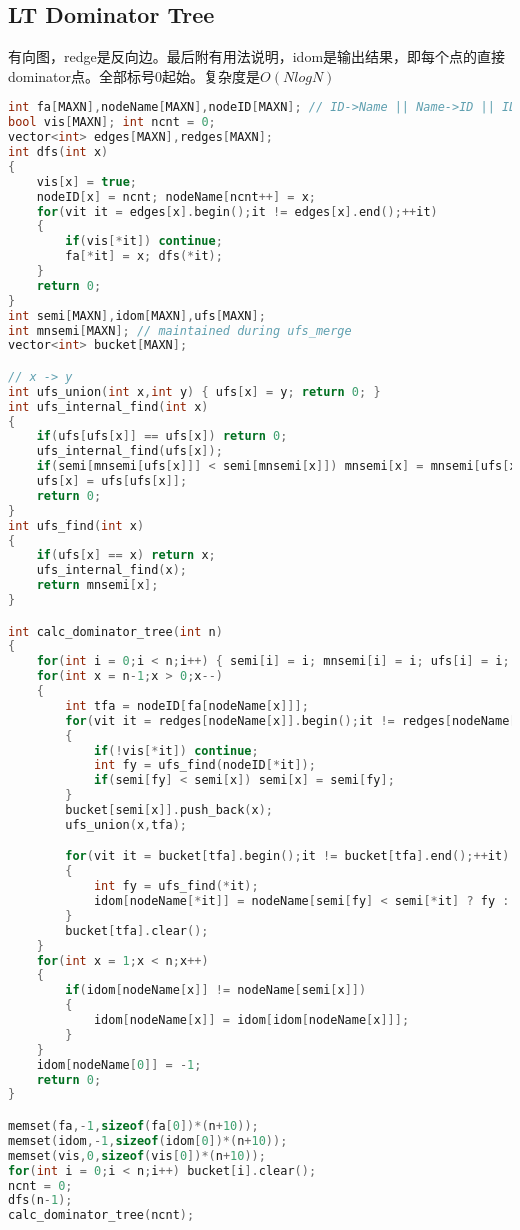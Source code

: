 \subsection{LT Dominator Tree}
有向图，redge是反向边。最后附有用法说明，idom是输出结果，即每个点的直接dominator点。全部标号0起始。复杂度是$O(N log N)$
\begin{lstlisting}[language=C++]
int fa[MAXN],nodeName[MAXN],nodeID[MAXN]; // ID->Name || Name->ID || ID = dfs order(DFN)
bool vis[MAXN]; int ncnt = 0;
vector<int> edges[MAXN],redges[MAXN];
int dfs(int x)
{
	vis[x] = true;
	nodeID[x] = ncnt; nodeName[ncnt++] = x;
	for(vit it = edges[x].begin();it != edges[x].end();++it)
	{
		if(vis[*it]) continue;
		fa[*it] = x; dfs(*it);
	}
	return 0;
}
int semi[MAXN],idom[MAXN],ufs[MAXN];
int mnsemi[MAXN]; // maintained during ufs_merge
vector<int> bucket[MAXN];

// x -> y
int ufs_union(int x,int y) { ufs[x] = y; return 0; }
int ufs_internal_find(int x)
{
	if(ufs[ufs[x]] == ufs[x]) return 0;
	ufs_internal_find(ufs[x]);
	if(semi[mnsemi[ufs[x]]] < semi[mnsemi[x]]) mnsemi[x] = mnsemi[ufs[x]];
	ufs[x] = ufs[ufs[x]];
	return 0;
}
int ufs_find(int x)
{
	if(ufs[x] == x) return x;
	ufs_internal_find(x);
	return mnsemi[x];
}

int calc_dominator_tree(int n)
{
	for(int i = 0;i < n;i++) { semi[i] = i; mnsemi[i] = i; ufs[i] = i; }
	for(int x = n-1;x > 0;x--)
	{
		int tfa = nodeID[fa[nodeName[x]]];
		for(vit it = redges[nodeName[x]].begin();it != redges[nodeName[x]].end();++it)
		{
			if(!vis[*it]) continue;
			int fy = ufs_find(nodeID[*it]);
			if(semi[fy] < semi[x]) semi[x] = semi[fy];
		}
		bucket[semi[x]].push_back(x);
		ufs_union(x,tfa);

		for(vit it = bucket[tfa].begin();it != bucket[tfa].end();++it)
		{
			int fy = ufs_find(*it);
			idom[nodeName[*it]] = nodeName[semi[fy] < semi[*it] ? fy : tfa];
		}
		bucket[tfa].clear();
	}
	for(int x = 1;x < n;x++)
	{
		if(idom[nodeName[x]] != nodeName[semi[x]])
		{
			idom[nodeName[x]] = idom[idom[nodeName[x]]];
		}
	}
	idom[nodeName[0]] = -1;
	return 0;
}

memset(fa,-1,sizeof(fa[0])*(n+10));
memset(idom,-1,sizeof(idom[0])*(n+10));
memset(vis,0,sizeof(vis[0])*(n+10));
for(int i = 0;i < n;i++) bucket[i].clear();
ncnt = 0;
dfs(n-1);
calc_dominator_tree(ncnt);
\end{lstlisting}
